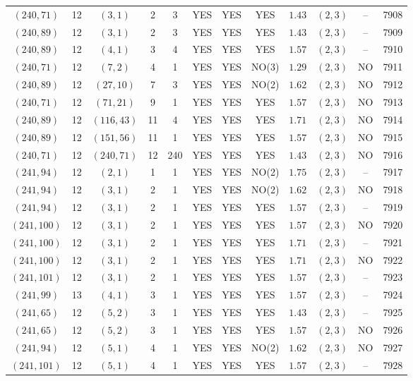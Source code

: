 \begin{longtable}{|c|c|c|c|c|c|c|c|c|c|c|c|}
$(240,71)$ & 12 & $(3,1)$ & 2 & 3 & YES & YES & YES & $1.43$ & $(2,3)$ & -- & 7908\\
$(240,89)$ & 12 & $(3,1)$ & 2 & 3 & YES & YES & YES & $1.43$ & $(2,3)$ & -- & 7909\\
$(240,89)$ & 12 & $(4,1)$ & 3 & 4 & YES & YES & YES & $1.57$ & $(2,3)$ & -- & 7910\\
$(240,71)$ & 12 & $(7,2)$ & 4 & 1 & YES & YES & NO(3) & $1.29$ & $(2,3)$ & NO & 7911\\
$(240,89)$ & 12 & $(27,10)$ & 7 & 3 & YES & YES & NO(2) & $1.62$ & $(2,3)$ & NO & 7912\\
$(240,71)$ & 12 & $(71,21)$ & 9 & 1 & YES & YES & YES & $1.57$ & $(2,3)$ & NO & 7913\\
$(240,89)$ & 12 & $(116,43)$ & 11 & 4 & YES & YES & YES & $1.71$ & $(2,3)$ & NO & 7914\\
$(240,89)$ & 12 & $(151,56)$ & 11 & 1 & YES & YES & YES & $1.57$ & $(2,3)$ & NO & 7915\\
$(240,71)$ & 12 & $(240,71)$ & 12 & 240 & YES & YES & YES & $1.43$ & $(2,3)$ & NO & 7916\\
$(241,94)$ & 12 & $(2,1)$ & 1 & 1 & YES & YES & NO(2) & $1.75$ & $(2,3)$ & -- & 7917\\
$(241,94)$ & 12 & $(3,1)$ & 2 & 1 & YES & YES & NO(2) & $1.62$ & $(2,3)$ & NO & 7918\\
$(241,94)$ & 12 & $(3,1)$ & 2 & 1 & YES & YES & YES & $1.57$ & $(2,3)$ & -- & 7919\\
$(241,100)$ & 12 & $(3,1)$ & 2 & 1 & YES & YES & YES & $1.57$ & $(2,3)$ & NO & 7920\\
$(241,100)$ & 12 & $(3,1)$ & 2 & 1 & YES & YES & YES & $1.71$ & $(2,3)$ & -- & 7921\\
$(241,100)$ & 12 & $(3,1)$ & 2 & 1 & YES & YES & YES & $1.71$ & $(2,3)$ & NO & 7922\\
$(241,101)$ & 12 & $(3,1)$ & 2 & 1 & YES & YES & YES & $1.57$ & $(2,3)$ & -- & 7923\\
$(241,99)$ & 13 & $(4,1)$ & 3 & 1 & YES & YES & YES & $1.57$ & $(2,3)$ & -- & 7924\\
$(241,65)$ & 12 & $(5,2)$ & 3 & 1 & YES & YES & YES & $1.43$ & $(2,3)$ & -- & 7925\\
$(241,65)$ & 12 & $(5,2)$ & 3 & 1 & YES & YES & YES & $1.57$ & $(2,3)$ & NO & 7926\\
$(241,94)$ & 12 & $(5,1)$ & 4 & 1 & YES & YES & NO(2) & $1.62$ & $(2,3)$ & NO & 7927\\
$(241,101)$ & 12 & $(5,1)$ & 4 & 1 & YES & YES & YES & $1.57$ & $(2,3)$ & -- & 7928\\

\end{longtable}
